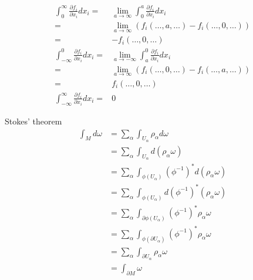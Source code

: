 \documentclass[9pt]{beamer}
\begin{document}
\begin{frame}
    \begin{align*}
        \int_0^\infty \frac{\partial f_i}{\partial x_i}dx_i=&\lim_{a \rightarrow \infty}\int_0^a \frac{\partial f_i}{\partial x_i} dx_i\\
        =&\lim_{a \rightarrow \infty}(f_i(\dots,a,\dots)-f_i(\dots,0,\dots))\\
        =&-f_i(\dots,0,\dots)\\
        \int_{-\infty}^0 \frac{\partial f_i}{\partial x_i}dx_i=&\lim_{a \rightarrow -\infty}\int_a^0 \frac{\partial f_i}{\partial x_i} dx_i\\
        =&\lim_{a \rightarrow \infty}(f_i(\dots,0,\dots)-f_i(\dots,a,\dots))\\
        =&f_i(\dots,0,\dots)\\
        \int_{-\infty}^\infty\frac{\partial f_i}{\partial x_i}dx_i=&0
    \end{align*}
\end{frame}

\begin{frame}{Stokes' theorem}
    \begin{align}
        \int_M{d\omega}&=\sum_\alpha\int_{U_\alpha}\rho_\alpha d\omega\\
        &=\sum_\alpha\int_{U_\alpha}d(\rho_\alpha\omega)\\
        &=\sum_\alpha\int_{\phi(U_\alpha)}(\phi^{-1})^*d(\rho_\alpha\omega)\\
        &=\sum_\alpha\int_{\phi(U_\alpha)}d(\phi^{-1})^*(\rho_\alpha\omega)\\
        &=\sum_\alpha\int_{\partial\phi(U_\alpha)}(\phi^{-1})^*\rho_\alpha\omega\\
        &=\sum_\alpha\int_{\phi(\partial U_\alpha)}(\phi^{-1})^*\rho_\alpha\omega\\
        &=\sum_\alpha\int_{\partial U_\alpha} \rho_\alpha\omega\\
        &=\int_{\partial M}\omega
    \end{align}
\end{frame}
\end{document}
